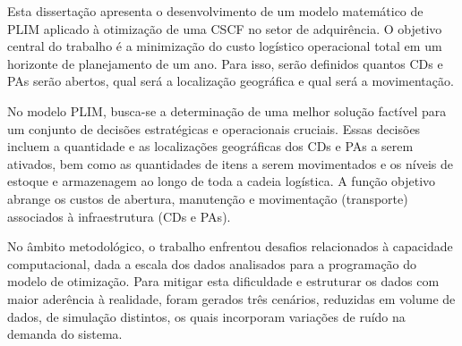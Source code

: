 

Esta dissertação apresenta o desenvolvimento de um modelo matemático de PLIM aplicado à otimização de uma CSCF no setor de adquirência. O objetivo central do trabalho é a minimização do custo logístico operacional total em um horizonte de planejamento de um ano. Para isso, serão definidos quantos CDs e PAs serão abertos, qual será a localização geográfica e qual será a movimentação.

No modelo PLIM, busca-se a determinação de uma melhor solução factível para um conjunto de decisões estratégicas e operacionais cruciais. Essas decisões incluem a quantidade e as localizações geográficas dos CDs e PAs a serem ativados, bem como as quantidades de itens a serem movimentados e os níveis de estoque e armazenagem ao longo de toda a cadeia logística. A função objetivo abrange os custos de abertura, manutenção e movimentação (transporte) associados à infraestrutura (CDs e PAs).

No âmbito metodológico, o trabalho enfrentou desafios relacionados à capacidade computacional, dada a escala dos dados analisados para a programação do modelo de otimização. Para mitigar esta dificuldade e estruturar os dados com maior aderência à realidade, foram gerados três cenários, reduzidas em volume de dados, de simulação distintos, os quais incorporam variações de ruído na demanda do sistema.

